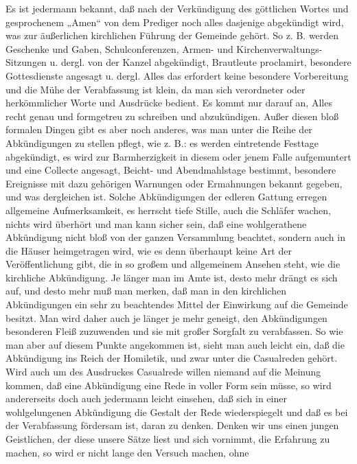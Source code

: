 Es ist jedermann bekannt, daß nach der Verkündigung des göttlichen Wortes und gesprochenem „Amen“ von dem Prediger noch alles dasjenige abgekündigt wird, was zur äußerlichen kirchlichen Führung der Gemeinde gehört. So z. B. werden Geschenke und Gaben, Schulconferenzen, Armen- und Kirchenverwaltungs-Sitzungen u. dergl. von der Kanzel abgekündigt, Brautleute proclamirt, besondere Gottesdienste angesagt u. dergl. Alles das erfordert keine besondere Vorbereitung und die Mühe der Verabfassung ist klein, da man sich verordneter oder herkömmlicher Worte und Ausdrücke bedient. Es kommt nur darauf an, Alles recht genau und formgetreu zu schreiben und abzukündigen. Außer diesen bloß formalen Dingen gibt es aber noch anderes, was man unter die Reihe der Abkündigungen zu stellen pflegt, wie z. B.: es werden eintretende Festtage abgekündigt, es wird zur Barmherzigkeit in diesem oder jenem Falle aufgemuntert und eine Collecte angesagt,
Beicht- und Abendmahlstage bestimmt, besondere Ereignisse mit dazu gehörigen Warnungen oder Ermahnungen bekannt gegeben, und was dergleichen ist. Solche Abkündigungen der edleren Gattung erregen allgemeine Aufmerksamkeit, es herrscht tiefe Stille, auch die Schläfer wachen, nichts wird überhört und man kann sicher sein, daß eine wohlgerathene Abkündigung nicht bloß von der ganzen Versammlung beachtet, sondern auch in die Häuser heimgetragen wird, wie es denn überhaupt keine Art der Veröffentlichung gibt, die in so großem und allgemeinem Ansehen steht, wie die kirchliche Abkündigung. Je länger man im Amte ist, desto mehr drängt es sich auf, und desto mehr muß man merken, daß man in den kirchlichen Abkündigungen ein sehr zu beachtendes Mittel der Einwirkung auf die Gemeinde besitzt. Man wird daher auch je länger je mehr geneigt, den Abkündigungen besonderen Fleiß zuzuwenden und sie mit großer Sorgfalt zu verabfassen. So wie man aber auf diesem Punkte angekommen ist, sieht man auch leicht ein, daß die Abkündigung ins Reich der Homiletik, und zwar unter die Casualreden gehört. Wird auch um des Ausdruckes Casualrede willen niemand auf die Meinung kommen, daß eine Abkündigung eine Rede in voller Form sein müsse, so wird andererseits doch auch jedermann leicht einsehen, daß sich in einer wohlgelungenen Abkündigung die Gestalt der Rede wiederspiegelt und daß es bei der Verabfassung fördersam ist, daran zu denken. Denken wir uns einen jungen Geistlichen, der diese unsere Sätze liest und sich vornimmt, die Erfahrung zu machen, so wird er nicht lange den Versuch machen, ohne
